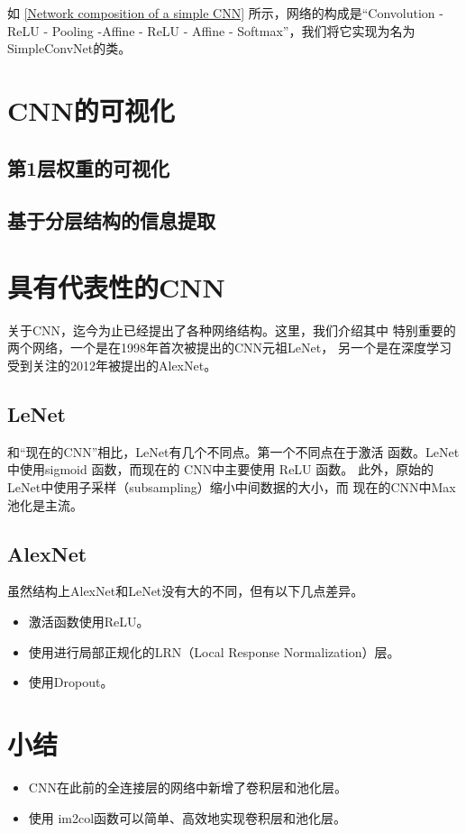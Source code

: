 如 \autoref{Network composition of a simple CNN} 所示，网络的构成是“Convolution - ReLU - Pooling -Affine -
ReLU - Affine - Softmax”，我们将它实现为名为 SimpleConvNet的类。



\section{CNN的可视化}
\subsection{第1层权重的可视化}
\subsection{基于分层结构的信息提取}

\section{具有代表性的CNN}
关于CNN，迄今为止已经提出了各种网络结构。这里，我们介绍其中
特别重要的两个网络，一个是在1998年首次被提出的CNN元祖LeNet，
另一个是在深度学习受到关注的2012年被提出的AlexNet。
\subsection{LeNet}

和“现在的CNN”相比，LeNet有几个不同点。第一个不同点在于激活
函数。LeNet 中使用sigmoid 函数，而现在的 CNN中主要使用 ReLU 函数。
此外，原始的LeNet中使用子采样（subsampling）缩小中间数据的大小，而
现在的CNN中Max池化是主流。

\subsection{AlexNet}

虽然结构上AlexNet和LeNet没有大的不同，但有以下几点差异。

\begin{itemize}
    \item 激活函数使用ReLU。
    \item 使用进行局部正规化的LRN（Local Response Normalization）层。
    \item 使用Dropout。
\end{itemize}

\section{小结}
\begin{itemize}
    \item CNN在此前的全连接层的网络中新增了卷积层和池化层。
    \item 使用 im2col函数可以简单、高效地实现卷积层和池化层。
\end{itemize}